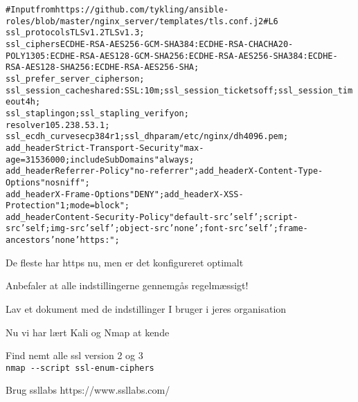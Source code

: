 \documentclass[Screen16to9,17pt]{foils}
\begin{document}

\begin{alltt}\footnotesize
  # Input from https://github.com/tykling/ansible-roles/blob/master/nginx_server/templates/tls.conf.j2#L6
  ssl_protocols                   TLSv1.2 TLSv1.3;
  ssl_ciphers                     ECDHE-RSA-AES256-GCM-SHA384:ECDHE-RSA-CHACHA20-POLY1305:ECDHE-RSA-AES128-GCM-SHA256:ECDHE-RSA-AES256-SHA384:ECDHE-RSA-AES128-SHA256:ECDHE-RSA-AES256-SHA;
  ssl_prefer_server_ciphers       on;
  ssl_session_cache               shared:SSL:10m;     ssl_session_tickets       off;   ssl_session_timeout    4h;
  ssl_stapling                    on;                 ssl_stapling_verify       on;
  resolver                        105.238.53.1;
  ssl_ecdh_curve secp384r1;                           ssl_dhparam /etc/nginx/dh4096.pem;
  add_header Strict-Transport-Security "max-age=31536000; includeSubDomains" always;
  add_header Referrer-Policy "no-referrer";  add_header X-Content-Type-Options "nosniff";
  add_header X-Frame-Options "DENY";  add_header X-XSS-Protection "1; mode=block";
  add_header Content-Security-Policy "default-src 'self'; script-src 'self; img-src 'self'; object-src 'none'; font-src 'self'; frame-ancestors 'none' https:";
\end{alltt}

\begin{list2}
\item De fleste har https nu, men er det konfigureret optimalt
\item Anbefaler at alle indstillingerne gennemgås regelmæssigt!
\item Lav et dokument med de indstillinger I bruger i jeres organisation
\end{list2}





\begin{list1}
\item Nu vi har lært Kali og Nmap at kende
\begin{list2}
\item Find nemt alle ssl version 2 og 3\\
\verb+nmap --script ssl-enum-ciphers+
\item Brug ssllabs https://www.ssllabs.com/
\end{list2}
\end{list1}
\end{document}
